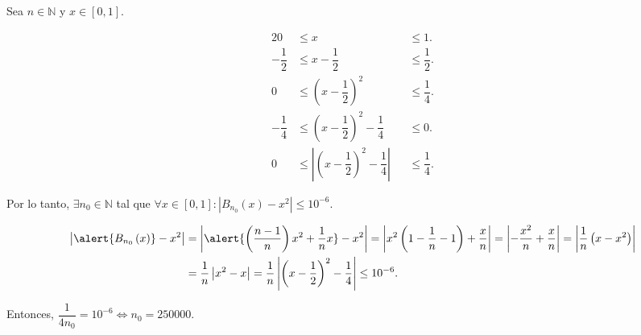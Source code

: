 \begin{frame}
	\begin{solution}
		Sea $n\in\mathbb{N}$ y $x\in\left[0,1\right]$.

		\begin{alignat*}{2}
			0             & \leq x                                                           &  & \leq 1.            \\
			-\dfrac{1}{2} & \leq x-\dfrac{1}{2}                                              &  & \leq \dfrac{1}{2}. \\
			0             & \leq {\left(x-\dfrac{1}{2}\right)}^{2}                           &  & \leq \dfrac{1}{4}. \\
			-\dfrac{1}{4} & \leq {\left(x-\dfrac{1}{2}\right)}^{2}-\dfrac{1}{4}              &  & \leq 0.            \\
			0             & \leq \left|{\left(x-\dfrac{1}{2}\right)}^{2}-\dfrac{1}{4}\right| &  & \leq \dfrac{1}{4}.
		\end{alignat*}

		Por lo tanto,
		\begin{math}
			\exists n_{0}\in\mathbb{N}
		\end{math}
		tal que
		\begin{math}
			\forall x\in\left[0,1\right]:
			\left|B_{n_{0}}\left(x\right)-x^{2}\right|\leq
			10^{-6}
		\end{math}.

		\begin{align*}
			\left|
			\alert{
				B_{n_{0}}\left(x\right)
			}
			-x^{2}
			\right| & =
			\left|
			\alert{
			\left(\dfrac{n-1}{n}\right)x^{2}+
			\dfrac{1}{n}x
			}
			-x^{2}
			\right|=
			\left|
			x^{2}\left(1-\dfrac{1}{n}-1\right)+\dfrac{x}{n}
			\right|=
			\left|
			-\dfrac{x^{2}}{n}+\dfrac{x}{n}
			\right|
			=\left|
			\dfrac{1}{n}
			\left(x-x^{2}\right)
			\right|     \\
			        & =
			\dfrac{1}{n}
			\left|
			x^{2}-x
			\right|=
			\dfrac{1}{n}
			\left|
			{\left(x-\dfrac{1}{2}\right)}^{2}-
			\dfrac{1}{4}
			\right|\leq
			10^{-6}.
		\end{align*}

		Entonces,
		\begin{math}
			\dfrac{1}{4n_{0}}=10^{-6}\iff n_{0}=250000
		\end{math}.
	\end{solution}
\end{frame}